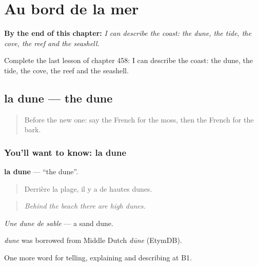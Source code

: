 
\chapter{Au bord de la mer}
\label{ch:fr-au-bord-de-la-mer}

\begin{chapteropening}
\textbf{By the end of this chapter:} \emph{I can describe the coast: the dune, the tide, the cove, the reef and the seashell.}

Complete the last lesson of chapter 458: I can describe the coast: the dune, the tide, the cove, the reef and the seashell.
\end{chapteropening}

\section[la dune]{la dune — the dune}

\label{lesson:FR-C458-dune}



\begin{quote}
Before the new one: say the French for the moss, then the French for the bark.
\end{quote}

\subsection*{You'll want to know: la dune}
\textbf{la dune} — \textquotedblleft{}the dune\textquotedblright{}.

\begin{quote}
Derrière la plage, il y a de hautes dunes.
\end{quote}

\begin{quote}
\emph{Behind the beach there are high dunes.}
\end{quote}

\emph{Une dune de sable} — a sand dune.

\begin{cousinweb}
\emph{dune} was borrowed from Middle Dutch \emph{dūne} (EtymDB).
\end{cousinweb}

\begin{grammarlens}[title={What you've built}]
One more word for telling, explaining and describing at B1.
\end{grammarlens}


